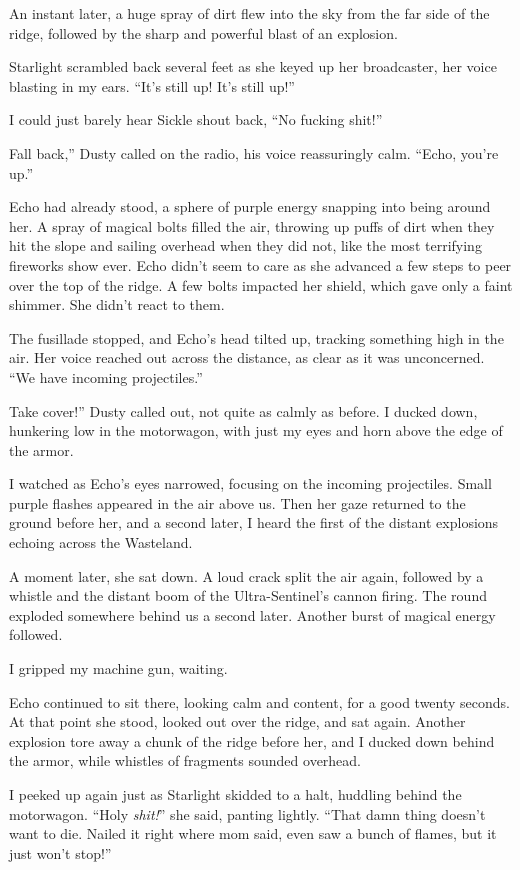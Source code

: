 An instant later, a huge spray of dirt flew into the sky from the far side of the ridge, followed by the sharp and powerful blast of an explosion.

Starlight scrambled back several feet as she keyed up her broadcaster, her voice blasting in my ears. “It’s still up! It’s still up!”

I could just barely hear Sickle shout back, “No fucking shit!”

\leavevmode{}Fall back,” Dusty called on the radio, his voice reassuringly calm. “Echo, you’re up.”

Echo had already stood, a sphere of purple energy snapping into being around her. A spray of magical bolts filled the air, throwing up puffs of dirt when they hit the slope and sailing overhead when they did not, like the most terrifying fireworks show ever. Echo didn’t seem to care as she advanced a few steps to peer over the top of the ridge. A few bolts impacted her shield, which gave only a faint shimmer. She didn’t react to them.

The fusillade stopped, and Echo’s head tilted up, tracking something high in the air. Her voice reached out across the distance, as clear as it was unconcerned. “We have incoming projectiles.”

\leavevmode{}Take cover!” Dusty called out, not quite as calmly as before. I ducked down, hunkering low in the motorwagon, with just my eyes and horn above the edge of the armor.

I watched as Echo’s eyes narrowed, focusing on the incoming projectiles. Small purple flashes appeared in the air above us. Then her gaze returned to the ground before her, and a second later, I heard the first of the distant explosions echoing across the Wasteland.

A moment later, she sat down. A loud crack split the air again, followed by a whistle and the distant boom of the Ultra-Sentinel’s cannon firing. The round exploded somewhere behind us a second later. Another burst of magical energy followed.

I gripped my machine gun, waiting.

Echo continued to sit there, looking calm and content, for a good twenty seconds. At that point she stood, looked out over the ridge, and sat again. Another explosion tore away a chunk of the ridge before her, and I ducked down behind the armor, while whistles of fragments sounded overhead.

I peeked up again just as Starlight skidded to a halt, huddling behind the motorwagon. “Holy \textit{shit!}” she said, panting lightly. “That damn thing doesn’t want to die. Nailed it right where mom said, even saw a bunch of flames, but it just won’t stop!”

